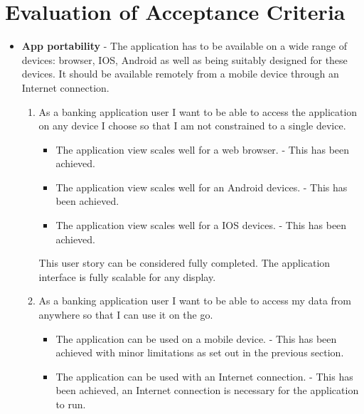 \section{Evaluation of Acceptance Criteria}
\begin{itemize}
\item \textbf{App portability} - The application has to be available on a wide range of devices: browser, IOS, Android as well as being suitably designed for these devices. It should be available remotely from a mobile device through an Internet connection.
        \begin{enumerate}
        \item As a banking application user I want to be able to access the application on any device I choose so that I am not constrained to a single device.
        \begin{itemize}
                \item The application view scales well for a web browser. - This has been achieved.
                \item The application view scales well for an Android devices. - This has been achieved.
                \item The application view scales well for a IOS devices. - This has been achieved.
            \end{itemize}
            This user story can be considered fully completed. The application interface is fully scalable for any display.
        \item As a banking application user I want to be able to access my data from anywhere so that I can use it on the go.
            \begin{itemize}
                \item The application can be used on a mobile device. - This has been achieved with minor limitations as set out in the previous section.
                \item The application can be used with an Internet connection. - This has been achieved, an Internet connection is necessary for the application to run.


\end{itemize}
\end{enumerate}
\end{itemize}
